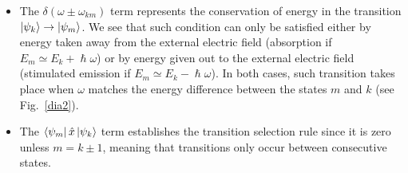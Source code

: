 \begin{itemize}
	\item {The $\delta(\omega \pm \omega_{km})$ term represents the conservation of energy in the transition $\ket{\psi_k} \to \ket{\psi_m}$. We see that such condition can only be satisfied either by energy taken away from the external electric field (absorption if $E_m \simeq E_k + \hslash \omega$) or by energy given out to the external electric field (stimulated emission if $E_m \simeq E_k - \hslash \omega$). In both cases, such transition takes place when $\omega$ matches the energy difference between the states $m$ and $k$ (see Fig.\ \ref{dia2})}.
	\item {The $\bra{\psi_m} \hat{x}  \ket{\psi_k} $ term establishes the transition selection rule since it is zero unless $m = k \pm 1$, meaning that transitions only occur between consecutive states.\!\cite{Sakurai1994}}
\end{itemize}
